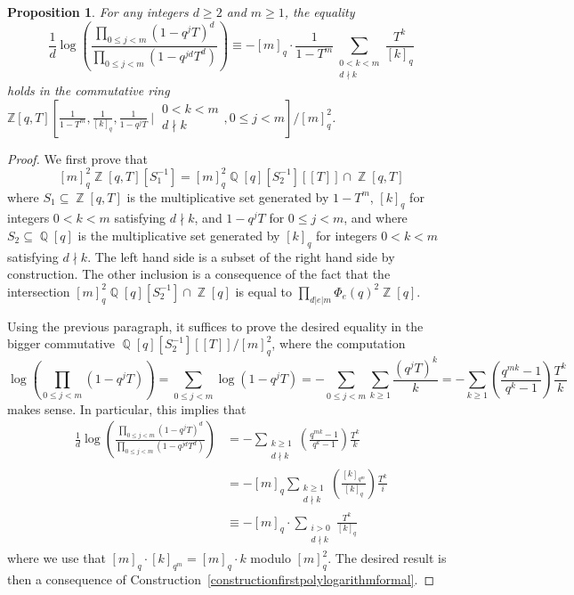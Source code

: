 \documentclass[10pt,twoside]{scrarticle}
\newtheorem{proposition}[theorem]{Proposition}
\theoremstyle{definition}
\DeclareMathOperator{\Z}{\mathbb{Z}}
\DeclareMathOperator{\Q}{\mathbb{Q}}
\renewcommand{\ge}{\geqslant}
\renewcommand{\le}{\leqslant}
\renewcommand{\geq}{\geqslant}
\numberwithin{equation}{theorem}
\begin{document}
\begin{proposition}\label{propositionkeycomputation}
    For any integers $d \ge 2$ and $m \ge 1$, the equality
    $$\frac{1}{d}\log\left(\frac{\prod_{0 \le j < m}{(1-q^j T)}^d}{\prod_{0 \le j < m}{(1-q^{jd} T^d)}}\right)\equiv -[m]_q \cdot \frac{1}{1-T^m}\sum_{\substack{0 < k < m \\ d \nmid k}} \frac{T^k}{[k]_q}$$
    holds in the commutative ring $\mathbb{Z}[q,T]\left[\frac{1}{1-T^m},\frac{1}{[k]_q},\frac{1}{1-q^jT}~\bigg|~\substack{0<k<m \\ d\nmid k},0 \le j < m\right]/[m]_q^2$.
\end{proposition}

\begin{proof}
    We first prove that
    $$[m]_q^2\Z[q,T][S_1^{-1}] = [m]_q^2\Q[q][S_2^{-1}][\![T]\!] \cap \Z[q,T]$$
    where $S_1 \subseteq \Z[q,T]$ is the multiplicative set generated by $1-T^m$, $[k]_q$ for integers $0<k<m$ satisfying $d \nmid k$, and $1-q^jT$ for $0 \le j < m$, and where $S_2 \subseteq \Q[q]$ is the multiplicative set generated by $[k]_q$ for integers $0<k<m$ satisfying $d \nmid k$. The left hand side is a subset of the right hand side by construction. The other inclusion is a consequence of the fact that the intersection $[m]_q^2\Q[q][S_2^{-1}] \cap \Z[q]$ is equal to $\prod_{d|e|m} \Phi_e(q)^2 \Z[q]$. 
    
    Using the previous paragraph, it suffices to prove the desired equality in the bigger commutative $\Q[q][S_2^{-1}][\![T]\!]/[m]_q^2$, where the computation
    \[
    \log\left(\prod_{0 \le j < m}{(1-q^j T)}\right)=\sum_{0 \le j < m}{\log(1-q^j T)}=-\sum_{0 \le j < m}{\sum_{k\geq 1}{\frac{(q^j T)^k}{k}}}=-\sum_{k\geq 1}{\left(\frac{q^{mk}-1}{q^k-1}\right) \frac{T^k}{k}}
    \]
    makes sense. In particular, this implies that
    \begin{align*}
    \frac{1}{d}\log\left(\frac{\prod_{0 \le j < m}{(1-q^j T)}^d}{\prod_{0 \le j < m}{(1-q^{jd} T^d)}}\right) &=-\sum_{\substack{k \geq 1 \\ d\nmid k}}{\left(\frac{q^{mk}-1}{q^k-1}\right) \frac{T^k}{k}} \\
    &=-[m]_q\sum_{\substack{k\geq 1 \\ d\nmid k}}{\left(\frac{[k]_{q^m}}{[k]_q}\right) \frac{T^k}{i}}\\
    &\equiv-[m]_q\cdot \sum_{\substack{i>0 \\ d\nmid k}}{\frac{T^k}{[k]_q}}
    \end{align*}
    where we use that $[m]_q \cdot [k]_{q^m} = [m]_q \cdot k$ modulo $[m]_q^2$. The desired result is then a consequence of Construction~\ref{constructionfirstpolylogarithmformal}.
\end{proof}
\end{document}
